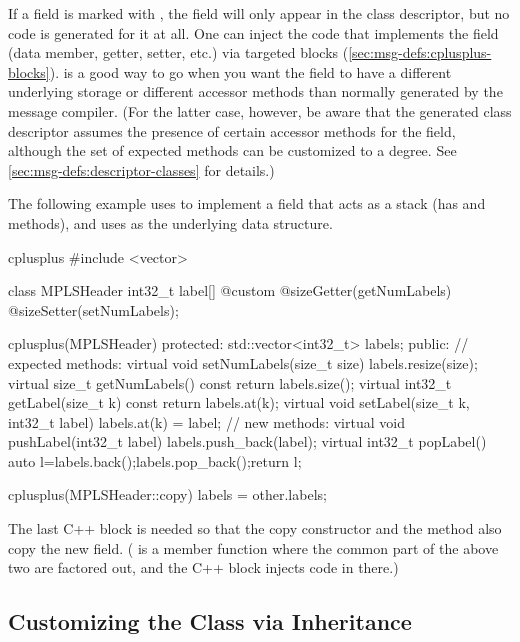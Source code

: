 If a field is marked with , the field will only appear in the
class descriptor, but no code is generated for it at all. One can inject the
code that implements the field (data member, getter, setter, etc.) via targeted
 blocks (\ref{sec:msg-defs:cplusplus-blocks}).
 is a good way to go when you want the field to have a different
underlying storage or different accessor methods than normally generated by the
message compiler. (For the latter case, however, be aware that the generated
class descriptor assumes the presence of certain accessor methods for the
field, although the set of expected methods can be customized to a degree. See
\ref{sec:msg-defs:descriptor-classes} for details.)

The following example uses  to implement a field that acts as
a stack (has  and  methods), and uses  as
the underlying data structure.

\begin{msg}
cplusplus {{
#include <vector>
}}

class MPLSHeader
{
    int32_t label[] @custom @sizeGetter(getNumLabels) @sizeSetter(setNumLabels);
}

cplusplus(MPLSHeader) {{
  protected:
    std::vector<int32_t> labels;
  public:
    // expected methods:
    virtual void setNumLabels(size_t size) {labels.resize(size);}
    virtual size_t getNumLabels() const {return labels.size();}
    virtual int32_t getLabel(size_t k) const {return labels.at(k);}
    virtual void setLabel(size_t k, int32_t label) {labels.at(k) = label;}
    // new methods:
    virtual void pushLabel(int32_t label) {labels.push_back(label);}
    virtual int32_t popLabel() {auto l=labels.back();labels.pop_back();return l;}
}}

cplusplus(MPLSHeader::copy) {{
    labels = other.labels;
}}
\end{msg}

The last C++ block is needed so that the copy constructor and the
 method also copy the new field. ( is a member
function where the common part of the above two are factored out, and the C++
block injects code in there.)


\subsection{Customizing the Class via Inheritance}
\label{sec:msg-defs:customizing-via-inheritance}

